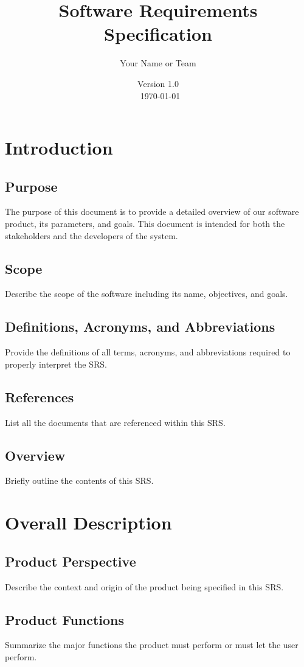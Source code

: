 \documentclass{article}
\title{Software Requirements Specification}
\author{Your Name or Team}
\date{Version 1.0 \\\ \today}
\begin{document}
\maketitle
\tableofcontents
\newpage

\section{Introduction}
\subsection{Purpose}
The purpose of this document is to provide a detailed overview of our software product, its parameters, and goals. This document is intended for both the stakeholders and the developers of the system.

\subsection{Scope}
Describe the scope of the software including its name, objectives, and goals.

\subsection{Definitions, Acronyms, and Abbreviations}
Provide the definitions of all terms, acronyms, and abbreviations required to properly interpret the SRS.

\subsection{References}
List all the documents that are referenced within this SRS.

\subsection{Overview}
Briefly outline the contents of this SRS.

\section{Overall Description}
\subsection{Product Perspective}
Describe the context and origin of the product being specified in this SRS.

\subsection{Product Functions}
Summarize the major functions the product must perform or must let the user perform.
\end{document}
